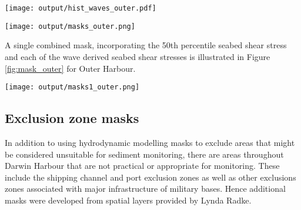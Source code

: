 \documentclass[a4paper]{article}
\let\origfigure=\figure
\let\endorigfigure=\endfigure
\renewenvironment{figure}[1][]{%
   \origfigure[H]
}{%
   \endorigfigure
}
\begin{document}
\begin{figure}
\centering\scriptsize
\texttt{[image: output/hist\_waves\_outer.pdf]}
\caption{Frequency distributions of wave modelling seabed shear stress
products in the Outer Harbour area.\label{fig:hist_waves_outer}}
\end{figure}

\begin{figure}
\centering\scriptsize
\texttt{[image: output/masks\_outer.png]}
\caption{Individual Outer Harbour masks from various hydrodynamic
(bedShear\_\emph{) and wave (beagle\_}) models categorised using a
threshold values of 0.2 for all other than the 75th percentile products
with use a threshold of 0.3 m/s. The blue areas indicate areas of
predicted relatively low erosion and transport potential and thus good
candidate areas for sample site allocation. The black dots illustrate
the position of Munksgaard 2012 sediment sampling
sites.\label{fig:masks_outer}}
\end{figure}

A single combined mask, incorporating the 50th percentile seabed shear
stress and each of the wave derived seabed shear stresses is illustrated
in Figure \ref{fig:mask_outer} for Outer Harbour.

\begin{figure}
\centering\scriptsize
\texttt{[image: output/masks1\_outer.png]}
\caption{Outer Harbour mask derived from the combination of 50th
percentile seabed shear stress and each of the wave derived seabed shear
stresses. The blue areas indicate areas of predicted relatively low
erosion and transport potential and thus good candidate areas for sample
site allocation. The black dots illustrate the position of Munksgaard
2012 sediment sampling sites.\label{fig:mask_outer}}
\end{figure}

\hypertarget{exclusion-zone-masks}{%
\subsection{Exclusion zone masks}\label{exclusion-zone-masks}}

In addition to using hydrodynamic modelling masks to exclude areas that
might be considered unsuitable for sediment monitoring, there are areas
throughout Darwin Harbour that are not practical or appropriate for
monitoring. These include the shipping channel and port exclusion zones
as well as other exclusions zones associated with major infrastructure
of military bases. Hence additional masks were developed from spatial
layers provided by Lynda Radke.
\end{document}
